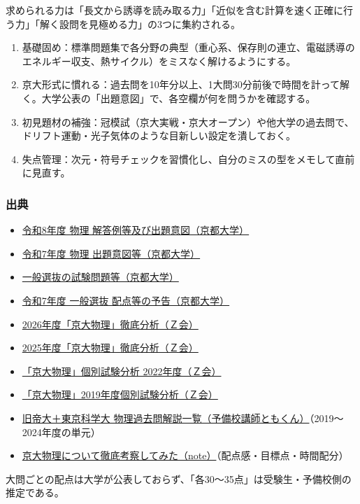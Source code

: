 \documentclass[
  10pt,
  a4paper,
]{article}
\providecommand{\tightlist}{%
  \setlength{\itemsep}{0pt}\setlength{\parskip}{0pt}}
\begin{document}
求められる力は「長文から誘導を読み取る力」「近似を含む計算を速く正確に行う力」「解く設問を見極める力」の3つに集約される。

\begin{enumerate}
\def\labelenumi{\arabic{enumi}.}
\tightlist
\item
  基礎固め：標準問題集で各分野の典型（重心系、保存則の連立、電磁誘導のエネルギー収支、熱サイクル）をミスなく解けるようにする。
\item
  京大形式に慣れる：過去問を10年分以上、1大問30分前後で時間を計って解く。大学公表の「出題意図」で、各空欄が何を問うかを確認する。
\item
  初見題材の補強：冠模試（京大実戦・京大オープン）や他大学の過去問で、ドリフト運動・光子気体のような目新しい設定を潰しておく。
\item
  失点管理：次元・符号チェックを習慣化し、自分のミスの型をメモして直前に見直す。
\end{enumerate}

\hypertarget{ux51faux5178}{%
\subsubsection{出典}\label{ux51faux5178}}

\begin{itemize}
\tightlist
\item
  \href{https://www.kyoto-u.ac.jp/sites/default/files/inline-files/admissionsundergradpast_eqR08_eqdocumentsR08_4_M101-0d8d15ec0534bc363a9803616a9f7815.pdf}{令和8年度
  物理 解答例等及び出題意図（京都大学）}
\item
  \href{https://www.kyoto-u.ac.jp/sites/default/files/inline-files/admissionsundergradpast_eqR07_eqdocumentsR07_4M101-48a28424405b7a93328b84b83d41604a.pdf}{令和7年度
  物理 出題意図等（京都大学）}
\item
  \href{https://www.kyoto-u.ac.jp/ja/admissions/undergrad/past-eq}{一般選抜の試験問題等（京都大学）}
\item
  \href{https://www.kyoto-u.ac.jp/sites/default/files/inline-files/r7-ippan-haiten.20230720-fef9e3eeb820f21604ccbd19081ff0fe.pdf}{令和7年度
  一般選抜 配点等の予告（京都大学）}
\item
  \href{https://www.zkai.co.jp/kyodai-exam/bunseki/butsuri/}{2026年度「京大物理」徹底分析（Ｚ会）}
\item
  \href{https://www.zkai.co.jp/kyodai-exam/bunseki/butsuri-2025/}{2025年度「京大物理」徹底分析（Ｚ会）}
\item
  \href{https://www.zkai.co.jp/kyodai-exam/bunseki/butsuri-2022/}{「京大物理」個別試験分析
  2022年度（Ｚ会）}
\item
  \href{https://www.zkai.co.jp/kyodai-exam/bunseki/butsuri-2019/}{「京大物理」2019年度個別試験分析（Ｚ会）}
\item
  \href{https://buturi0117.com/kakomonichiran-1/}{旧帝大＋東京科学大
  物理過去問解説一覧（予備校講師ともくん）}（2019〜2024年度の単元）
\item
  \href{https://note.com/epsilon_1031/n/n373320600e1c}{京大物理について徹底考察してみた（note）}（配点感・目標点・時間配分）
\end{itemize}

大問ごとの配点は大学が公表しておらず、「各30〜35点」は受験生・予備校側の推定である。
\end{document}
